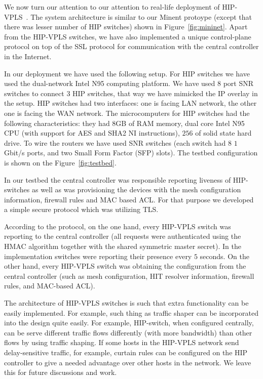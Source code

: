 We now turn our attention to our attention to real-life deployment 
of HIP-VPLS~\cite{hipvpls-hw, hipvpls-controller}. The system architecture is similar to our Minent protoype
(except that there was lesser number of HIP switches) shown in Figure~\ref{fig:mininet}. 
Apart from the HIP-VPLS switches, we have also implemented a unique 
control-plane protocol on top of the SSL protocol for communication 
with the central controller in the Internet.

In our deployment we have used the following setup. For HIP switches we 
have used the dual-network Intel N95 computing platform. We have used $8$ 
port SNR switches to connect $3$ HIP switches, that way we have mimicked the 
IP overlay in the setup. HIP switches had two interfaces: one is facing 
LAN network, the other one is facing the WAN network. The microcomputers for
HIP switches had the following characteristics: they had $8$GB of RAM memory, 
dual core Intel N95 CPU (with support for AES and SHA2 NI instructions), $256$ of 
solid state hard drive. To wire the routers we have used SNR switches 
(each switch had $8$ $1$ Gbit/s ports, and two Small Form Factor (SFP) slots). 
The testbed configuration is shown on the Figure~\ref{fig:testbed}.

In our testbed the central controller was responsible 
reporting liveness of HIP-switches as well as was provisioning 
the devices with the mesh configuration information, firewall rules 
and MAC based ACL. For that purpose we developed a simple 
secure protocol which was utilizing TLS.

According to the protocol, on the one hand, every HIP-VPLS 
switch was reporting to the central controller (all requests were authenticated 
using the HMAC algorithm together with the shared symmetric 
master secret). In the implementation switches were reporting 
their presence every $5$ seconds. On the other hand, every HIP-VPLS switch was obtaining 
the configuration from the central controller (such as mesh 
configuration, HIT resolver information, firewall rules, and 
MAC-based ACL). 

{\eat 
The architecture of HIP-VPLS switches is such
that extra functionality can be easily implemented. For example,
such thing as traffic shaper can be incorporated into the design
quite easily. For example, HIP-switch, when configured centrally, 
can be serve different traffic flows differently (with more bandwidth) than other 
flows by using traffic shaping. If some hosts in the HIP-VPLS network send delay-sensitive traffic, 
for example, curtain rules can be configured on the HIP controller 
to give a needed advantage over other hosts in the network. We 
leave this for future discussions and work.
}

